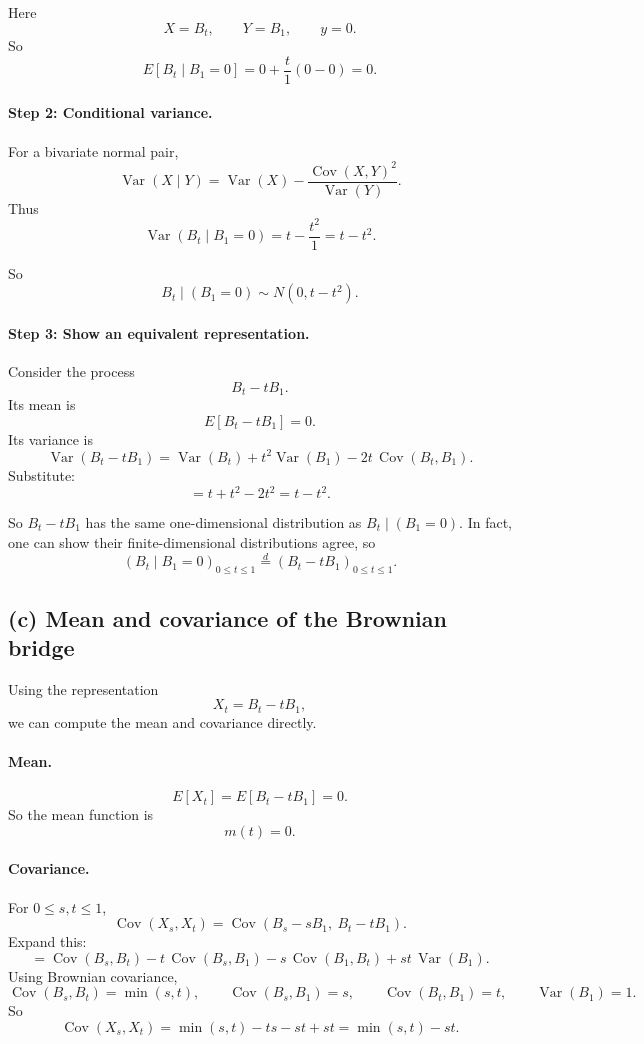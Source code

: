 \documentclass[11pt]{article}
\begin{document}
Here
\[
X=B_t,\qquad Y=B_1,\qquad y=0.
\]
So
\[
E[B_t\mid B_1=0]
=
0+\frac{t}{1}(0-0)=0.
\]

\paragraph{Step 2: Conditional variance.}

For a bivariate normal pair,
\[
\operatorname{Var}(X\mid Y)
=
\operatorname{Var}(X)-\frac{\operatorname{Cov}(X,Y)^2}{\operatorname{Var}(Y)}.
\]
Thus
\[
\operatorname{Var}(B_t\mid B_1=0)
=
t-\frac{t^2}{1}
=
t-t^2.
\]

So
\[
\boxed{
B_t\mid(B_1=0)\sim N(0,t-t^2).
}
\]

\paragraph{Step 3: Show an equivalent representation.}

Consider the process
\[
B_t-tB_1.
\]
Its mean is
\[
E[B_t-tB_1]=0.
\]
Its variance is
\[
\operatorname{Var}(B_t-tB_1)
=
\operatorname{Var}(B_t)+t^2\operatorname{Var}(B_1)-2t\,\operatorname{Cov}(B_t,B_1).
\]
Substitute:
\[
=t+t^2-2t^2
=t-t^2.
\]

So $B_t-tB_1$ has the same one-dimensional distribution as $B_t\mid(B_1=0)$.
In fact, one can show their finite-dimensional distributions agree, so
\[
\boxed{
(B_t\mid B_1=0)_{0\le t\le1}
\overset{d}{=}
(B_t-tB_1)_{0\le t\le1}.
}
\]

\subsection*{(c) Mean and covariance of the Brownian bridge}

Using the representation
\[
X_t=B_t-tB_1,
\]
we can compute the mean and covariance directly.

\paragraph{Mean.}

\[
E[X_t]=E[B_t-tB_1]=0.
\]
So the mean function is
\[
\boxed{m(t)=0.}
\]

\paragraph{Covariance.}

For $0\le s,t\le1$,
\[
\operatorname{Cov}(X_s,X_t)
=
\operatorname{Cov}(B_s-sB_1,\ B_t-tB_1).
\]
Expand this:
\[
=
\operatorname{Cov}(B_s,B_t)
-
t\,\operatorname{Cov}(B_s,B_1)
-
s\,\operatorname{Cov}(B_1,B_t)
+
st\,\operatorname{Var}(B_1).
\]
Using Brownian covariance,
\[
\operatorname{Cov}(B_s,B_t)=\min(s,t),
\qquad
\operatorname{Cov}(B_s,B_1)=s,
\qquad
\operatorname{Cov}(B_t,B_1)=t,
\qquad
\operatorname{Var}(B_1)=1.
\]
So
\[
\operatorname{Cov}(X_s,X_t)
=
\min(s,t)-ts-st+st
=
\min(s,t)-st.
\]
\end{document}
